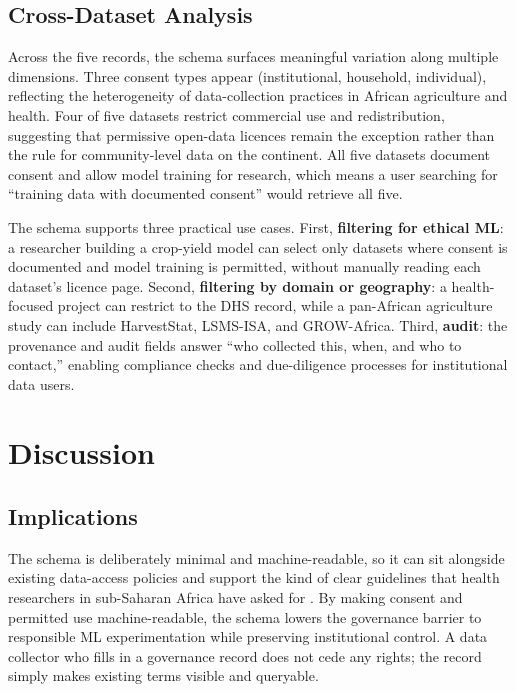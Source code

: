 \documentclass{article}
\begin{document}
\subsection{Cross-Dataset Analysis}

Across the five records, the schema surfaces meaningful variation along multiple dimensions. Three consent types appear (institutional, household, individual), reflecting the heterogeneity of data-collection practices in African agriculture and health. Four of five datasets restrict commercial use and redistribution, suggesting that permissive open-data licences remain the exception rather than the rule for community-level data on the continent. All five datasets document consent and allow model training for research, which means a user searching for ``training data with documented consent'' would retrieve all five.

The schema supports three practical use cases. First, \textbf{filtering for ethical ML}: a researcher building a crop-yield model can select only datasets where consent is documented and model training is permitted, without manually reading each dataset's licence page. Second, \textbf{filtering by domain or geography}: a health-focused project can restrict to the DHS record, while a pan-African agriculture study can include HarvestStat, LSMS-ISA, and GROW-Africa. Third, \textbf{audit}: the provenance and audit fields answer ``who collected this, when, and who to contact,'' enabling compliance checks and due-diligence processes for institutional data users.

\section{Discussion}
\label{sec:discussion}

\subsection{Implications}

The schema is deliberately minimal and machine-readable, so it can sit alongside existing data-access policies \cite{effoduh2024} and support the kind of clear guidelines that health researchers in sub-Saharan Africa have asked for \cite{brown2024,chabilall2024}. By making consent and permitted use machine-readable, the schema lowers the governance barrier to responsible ML experimentation while preserving institutional control. A data collector who fills in a governance record does not cede any rights; the record simply makes existing terms visible and queryable.
\end{document}
